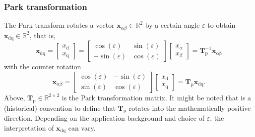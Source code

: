\begin{frame}
	\frametitle{Park transformation}
    The Park transform rotates a vector $\bm{x}_{\alpha \beta}\in\mathbb{R}^2$ by a certain angle $\varepsilon$ to obtain $\bm{x}_\mathrm{dq}\in\mathbb{R}^2$, that is, 
    \begin{equation}
        \renewcommand{\arraystretch}{1.2}
        \bm{x}_{\mathrm{dq}} = \begin{bmatrix} x_\mathrm{d} \\ x_\mathrm{q} \end{bmatrix} = \begin{bmatrix}
            \cos(\varepsilon) & \sin(\varepsilon)\\
            -\sin(\varepsilon) & \cos(\varepsilon)
        \end{bmatrix} \begin{bmatrix} x_\alpha \\ x_\beta \end{bmatrix} = \bm{T}_\mathrm{p}^{-1} \bm{x}_\mathrm{\alpha \beta} 
        \label{eq:Park_transformation}
    \end{equation}
    with the counter rotation
    \begin{equation}
        \renewcommand{\arraystretch}{1.2}
        \bm{x}_{\alpha \beta} = \begin{bmatrix}
            \cos(\varepsilon) & -\sin(\varepsilon)\\
            \sin(\varepsilon) & \cos(\varepsilon)
        \end{bmatrix} \begin{bmatrix} x_\mathrm{d} \\ x_\mathrm{q} \end{bmatrix} = \bm{T}_\mathrm{p} \bm{x}_{\mathrm{dq}}.
    \end{equation}
    Above, $\bm{T}_\mathrm{p}\in\mathbb{R}^{2\times 2}$ is the Park transformation matrix. It might be noted that is a (historical) convention to define that $\bm{T}_\mathrm{p}$ rotates into the mathematically positive direction. Depending on the application background and choice of $\varepsilon$, the interpretation of $\bm{x}_\mathrm{dq}$ can vary.
\end{frame}

